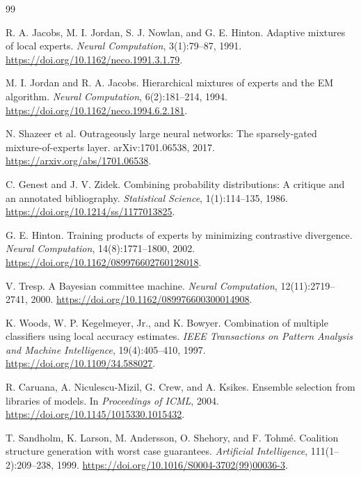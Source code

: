\documentclass[11pt]{article}
\theoremstyle{definition}
\theoremstyle{plain}
\begin{document}
\begin{thebibliography}{99}

R. A. Jacobs, M. I. Jordan, S. J. Nowlan, and G. E. Hinton.
\newblock Adaptive mixtures of local experts.
\newblock \emph{Neural Computation}, 3(1):79--87, 1991.
\newblock \url{https://doi.org/10.1162/neco.1991.3.1.79}.

M. I. Jordan and R. A. Jacobs.
\newblock Hierarchical mixtures of experts and the EM algorithm.
\newblock \emph{Neural Computation}, 6(2):181--214, 1994.
\newblock \url{https://doi.org/10.1162/neco.1994.6.2.181}.

N. Shazeer et al.
\newblock Outrageously large neural networks: The sparsely-gated
mixture-of-experts layer.
\newblock arXiv:1701.06538, 2017.
\newblock \url{https://arxiv.org/abs/1701.06538}.

C. Genest and J. V. Zidek.
\newblock Combining probability distributions: A critique and an annotated
bibliography.
\newblock \emph{Statistical Science}, 1(1):114--135, 1986.
\newblock \url{https://doi.org/10.1214/ss/1177013825}.

G. E. Hinton.
\newblock Training products of experts by minimizing contrastive divergence.
\newblock \emph{Neural Computation}, 14(8):1771--1800, 2002.
\newblock \url{https://doi.org/10.1162/089976602760128018}.

V. Tresp.
\newblock A Bayesian committee machine.
\newblock \emph{Neural Computation}, 12(11):2719--2741, 2000.
\newblock \url{https://doi.org/10.1162/089976600300014908}.

K. Woods, W. P. Kegelmeyer, Jr., and K. Bowyer.
\newblock Combination of multiple classifiers using local accuracy estimates.
\newblock \emph{IEEE Transactions on Pattern Analysis and Machine
Intelligence}, 19(4):405--410, 1997.
\newblock \url{https://doi.org/10.1109/34.588027}.

R. Caruana, A. Niculescu-Mizil, G. Crew, and A. Ksikes.
\newblock Ensemble selection from libraries of models.
\newblock In \emph{Proceedings of ICML}, 2004.
\newblock \url{https://doi.org/10.1145/1015330.1015432}.

T. Sandholm, K. Larson, M. Andersson, O. Shehory, and F. Tohm\'e.
\newblock Coalition structure generation with worst case guarantees.
\newblock \emph{Artificial Intelligence}, 111(1--2):209--238, 1999.
\newblock \url{https://doi.org/10.1016/S0004-3702(99)00036-3}.


\end{thebibliography}
\end{document}
